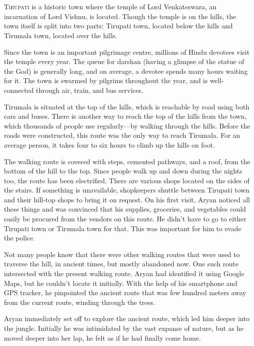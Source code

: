 \chapter{}

\lettrine{T}{irupati} is a historic town where the temple of Lord Venkateswara, an  
incarnation of Lord Vishnu, is located. Though the temple is on the hills, the town itself is split into two parts: Tirupati town, located below the hills and Tirumala town, located over the hills.

Since the town is an important pilgrimage centre, millions of Hindu devotees visit the 
temple every year. The queue for darshan (having a glimpse of the statue of the God) is
generally long, and on average, a devotee spends many hours waiting for
it. The town is swarmed by pilgrims throughout the year, and is well-connected
through air, train, and bus services.

Tirumala is situated at the top of the hills, which is reachable by road using both cars and
buses. There is another way to reach the top of the hills from the town,
which thousands of people use regularly—by walking through the hills. Before
the roads were constructed, this route was the only way to reach Tirumala. For an average
person, it takes four to six hours to climb up the hills on foot.

The walking route is covered with steps, cemented pathways, and a roof, from the bottom
of the hill to the top. Since people walk up and down during the nights too, the
route has been electrified. There are various shops located on the sides of the
stairs. If something is unavailable, shopkeepers shuttle between Tirupati town
and their hill-top shops to bring it on request. On his first visit, Aryan
noticed all these things and was convinced that his supplies, groceries,
and vegetables could easily be procured from the vendors on this route. He didn't
have to go to either Tirupati town or Tirumala town for that. This was important for
him to evade the police.

Not many people know that there were other walking routes that were used to
traverse the hill, in ancient times, but mostly abandoned now. One such
route intersected with the present walking route. Aryan had identified it using
Google Maps, but he couldn't locate it initially. With the help of his
smartphone and GPS tracker, he pinpointed the ancient route that was few hundred
meters away from the current route, winding through the trees.

Aryan immediately set off to explore the ancient route, which led him deeper into the jungle. Initially he was intimidated by the vast expanse of nature, but as he moved deeper
into her lap, he felt as if he had finally come home.

